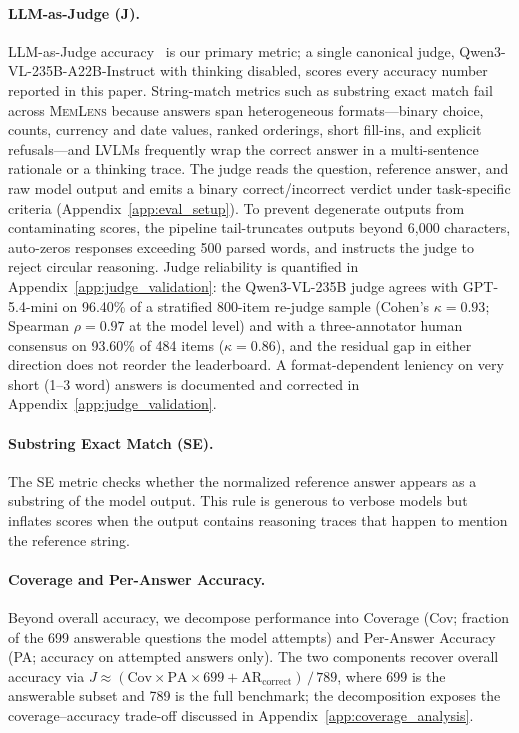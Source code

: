 \documentclass{llmxive}
\providecommand{\bench}{\textsc{MemLens}}
\begin{document}
\paragraph{LLM-as-Judge (J).}
LLM-as-Judge accuracy~\cite{zheng2023judging} is our primary metric; a single canonical judge, Qwen3-VL-235B-A22B-Instruct with thinking disabled, scores every accuracy number reported in this paper.
String-match metrics such as substring exact match fail across \bench{} because answers span heterogeneous formats---binary choice, counts, currency and date values, ranked orderings, short fill-ins, and explicit refusals---and LVLMs frequently wrap the correct answer in a multi-sentence rationale or a thinking trace.
The judge reads the question, reference answer, and raw model output and emits a binary correct/incorrect verdict under task-specific criteria (Appendix~\ref{app:eval_setup}).
To prevent degenerate outputs from contaminating scores, the pipeline tail-truncates outputs beyond 6{,}000 characters, auto-zeros responses exceeding 500 parsed words, and instructs the judge to reject circular reasoning.
Judge reliability is quantified in Appendix~\ref{app:judge_validation}: the Qwen3-VL-235B judge agrees with GPT-5.4-mini on 96.40\% of a stratified 800-item re-judge sample (Cohen's $\kappa = 0.93$; Spearman $\rho = 0.97$ at the model level) and with a three-annotator human consensus on 93.60\% of 484 items ($\kappa = 0.86$), and the residual gap in either direction does not reorder the leaderboard.
A format-dependent leniency on very short (1--3 word) answers is documented and corrected in Appendix~\ref{app:judge_validation}.

\paragraph{Substring Exact Match (SE).}
The SE metric checks whether the normalized reference answer appears as a substring of the model output.
This rule is generous to verbose models but inflates scores when the output contains reasoning traces that happen to mention the reference string.

\paragraph{Coverage and Per-Answer Accuracy.}
Beyond overall accuracy, we decompose performance into Coverage (Cov; fraction of the 699 answerable questions the model attempts) and Per-Answer Accuracy (PA; accuracy on attempted answers only).
The two components recover overall accuracy via $J \approx (\text{Cov} \times \text{PA} \times 699 + \text{AR}_{\text{correct}})\,/\,789$, where 699 is the answerable subset and 789 is the full benchmark; the decomposition exposes the coverage--accuracy trade-off discussed in Appendix~\ref{app:coverage_analysis}.
\end{document}
